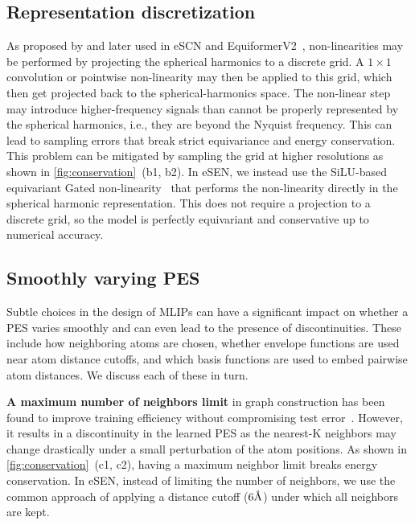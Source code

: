 \documentclass[twocolumn]{fairmeta}
\newcommand{\ourmodel}{eSEN}
\begin{document}
\subsection{Representation discretization}
As proposed by \citealt{cohen2016group} and later used in eSCN and EquiformerV2~\citep{zitnick2022spherical, passaro2023reducing, liao2023equiformerv2}, non-linearities may be performed by projecting the spherical harmonics to a discrete grid. A $1 \times 1$ convolution or pointwise non-linearity may then be applied to this grid, which then get projected back to the spherical-harmonics space. The non-linear step may introduce higher-frequency signals than cannot be properly represented by the spherical harmonics, i.e., they are beyond the Nyquist frequency. This can lead to sampling errors that break strict equivariance and energy conservation. This problem can be mitigated by sampling the grid at higher resolutions as shown in \cref{fig:conservation}~(b1, b2). In \ourmodel, we instead use the SiLU-based equivariant Gated non-linearity~\citep{weiler20183d, geiger2022e3nn} that performs the non-linearity directly in the spherical harmonic representation. This does not require a projection to a discrete grid, so the model is perfectly equivariant and conservative up to numerical accuracy. 

\subsection{Smoothly varying PES}

Subtle choices in the design of MLIPs can have a significant impact on whether a PES varies smoothly and can even lead to the presence of discontinuities. These include how neighboring atoms are chosen, whether envelope functions are used near atom distance cutoffs, and which basis functions are used to embed pairwise atom distances. We discuss each of these in turn. 

\textbf{A maximum number of neighbors limit} in graph construction has been found to improve training efficiency without compromising test error~\citep{liao2023equiformerv2, qu2024the}. However, it results in a discontinuity in the learned PES as the nearest-K neighbors may change drastically under a small perturbation of the atom positions. As shown in \cref{fig:conservation}~(c1, c2), having a maximum neighbor limit breaks energy conservation. In \ourmodel, instead of limiting the number of neighbors, we use the common approach of applying a distance cutoff ($6\textup{\AA}$) under which all neighbors are kept.
\end{document}

